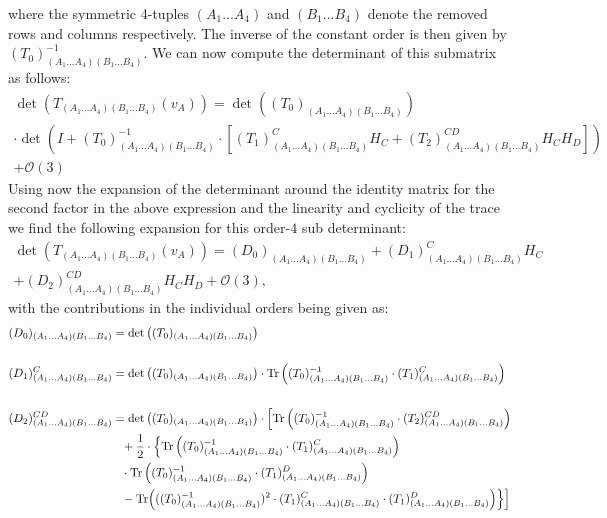 where the symmetric 4-tuples $(A_1...A_4)$ and $(B_1...B_4)$ denote the removed rows and columns respectively. The inverse of the constant order is then given by $(T_0)^{-1}_{(A_1...A_4)(B_1...B_4)}$. We can now compute the determinant of this submatrix as follows:
\begin{multline}
    \operatorname{det}\left(T_{(A_1...A_4)(B_1...B_4)}(v_A)\right)
    = \operatorname{det}\left((T_0)_{(A_1...A_4)(B_1...B_4)}\right)\\ 
    \cdot \operatorname{det}\left (I +(T_0)^{-1}_{(A_1...A_4)(B_1...B_4)}
    \cdot \left [ (T_1)_{(A_1...A_4)(B_1...B_4)}^{C} H_C+(T_2)_{(A_1...A_4)(B_1...B_4)}^{CD} H_C H_D \right ]  \right ) \\
    + \mathcal{O}(3)  
\end{multline}
Using now the expansion of the determinant around the identity matrix for the second factor in the above expression and the linearity and cyclicity of the trace we
find the following expansion for this order-$4$ sub determinant:
\begin{multline}
    \operatorname{det}\left(T_{(A_1...A_4)(B_1...B_4)}(v_A)\right) = (D_0)_{(A_1...A_4)(B_1...B_4)} + (D_1)^C_{(A_1...A_4)(B_1...B_4)}H_C\\
    +(D_2)^{CD}_{(A_1...A_4)(B_1...B_4)}H_CH_D
    + \mathcal{O}(3),
\end{multline}
with the contributions in the individual orders being given as: 
\begin{align}\label{polyMatrices}
\begin{aligned}
  (D_0)_{(A_1...A_4)(B_1...B_4)} &=  \operatorname{det}\left((T_0)_{(A_1...A_4)(B_1...B_4)}\right) \\
  \\
  (D_1)^C_{(A_1...A_4)(B_1...B_4)} &= \operatorname{det}\left((T_0)_{(A_1...A_4)(B_1...B_4)}\right) \cdot \operatorname{Tr} \left ( (T_0)^{-1}_{(A_1...A_4)(B_1...B_4)}
    \cdot (T_1)_{(A_1...A_4)(B_1...B_4)}^{C} \right) \\
    \\
    (D_2)^{CD}_{(A_1...A_4)(B_1...B_4)} &= \operatorname{det}\left((T_0)_{(A_1...A_4)(B_1...B_4)}\right)
     \cdot \Bigl [ \operatorname{Tr} \left ( (T_0)^{-1}_{(A_1...A_4)(B_1...B_4)}
    \cdot (T_2)_{(A_1...A_4)(B_1...B_4)}^{CD} \right ) \\
     &\hphantom{=}
    + \frac{1}{2} \cdot \Bigl \{ \operatorname{Tr}\left ( (T_0)^{-1}_{(A_1...A_4)(B_1...B_4)} \cdot (T_1)_{(A_1...A_4)(B_1...B_4)}^{C} \right )\\
     &\hphantom{=} \cdot \operatorname{Tr}\left ( (T_0)^{-1}_{(A_1...A_4)(B_1...B_4)} \cdot (T_1)_{(A_1...A_4)(B_1...B_4)}^{D} \right )  \\
      &\hphantom{=} 
    - \operatorname{Tr}\Bigl  (((T_0)^{-1}_{(A_1...A_4)(B_1...B_4)})^2 \cdot (T_1)_{(A_1...A_4)(B_1...B_4)}^{C} \cdot (T_1)_{(A_1...A_4)(B_1...B_4)}^{D}  \Bigr )    \Bigr \} \Bigr ]
    \end{aligned}
\end{align}
